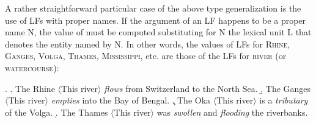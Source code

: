 \begin{center}
\footnotesize
{}
\end{center}

A rather straightforward particular case of the above type generalization is the use of LFs with proper names. If the argument of an LF  happens to be a proper name N, the value of  must be computed substituting for N the lexical unit L that denotes the entity named by N. In other words, the values of LFs for \textsc{Rhine}, \textsc{Ganges}, \textsc{Volga}, \textsc{Thames}, \textsc{Mississippi}, etc. are those of the LFs for \textsc{river} (or \textsc{watercourse}):

\begingroup
\small

\ex. \a. The Rhine $\langle$This river$\rangle$ \emph{flows} from Switzerland to the North Sea.
     \b. The Ganges $\langle$This river$\rangle$ \emph{empties} into the Bay of Bengal.
     \c. The Oka $\langle$This river$\rangle$ is a \emph{tributary} of the Volga.
     \d. The Thames $\langle$This river$\rangle$ was \emph{swollen} and \emph{flooding} the riverbanks.

